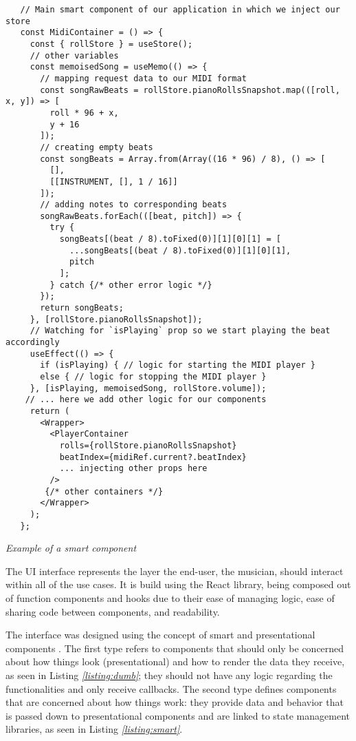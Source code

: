 \begin{listing}
  \begin{verbatim}
   // Main smart component of our application in which we inject our store
   const MidiContainer = () => {
     const { rollStore } = useStore();
     // other variables
     const memoisedSong = useMemo(() => {
       // mapping request data to our MIDI format
       const songRawBeats = rollStore.pianoRollsSnapshot.map(([roll, x, y]) => [
         roll * 96 + x,
         y + 16
       ]);
       // creating empty beats
       const songBeats = Array.from(Array((16 * 96) / 8), () => [
         [],
         [[INSTRUMENT, [], 1 / 16]]
       ]);
       // adding notes to corresponding beats
       songRawBeats.forEach(([beat, pitch]) => {
         try {
           songBeats[(beat / 8).toFixed(0)][1][0][1] = [
             ...songBeats[(beat / 8).toFixed(0)][1][0][1],
             pitch
           ];
         } catch {/* other error logic */}
       });
       return songBeats;
     }, [rollStore.pianoRollsSnapshot]);
     // Watching for `isPlaying` prop so we start playing the beat accordingly
     useEffect(() => {
       if (isPlaying) { // logic for starting the MIDI player }
       else { // logic for stopping the MIDI player }
     }, [isPlaying, memoisedSong, rollStore.volume]);
    // ... here we add other logic for our components
     return (
       <Wrapper>
         <PlayerContainer
           rolls={rollStore.pianoRollsSnapshot}
           beatIndex={midiRef.current?.beatIndex}
           ... injecting other props here
         />
        {/* other containers */}
       </Wrapper>
     );
   };
  \end{verbatim}
  \caption{\emph{Example of a smart component}}
  \label{listing:smart}
\end{listing}


The UI interface represents the layer the end-user,
the musician, should interact within all of the use cases.
It is build using the React library,
being composed out of function components and hooks due
to their ease of managing logic,
ease of sharing code between components, and readability.

The interface was designed using the concept of smart and presentational
components \cite{smart_dumb}. The first type refers to components that
should only be concerned about how things look (presentational)
and how to render the data they receive, as seen in Listing \emph{\ref{listing:dumb}};
they should not have any logic regarding the functionalities and
only receive callbacks. The second type defines components
that are concerned about how things work:
they provide data and behavior that is passed down
to presentational components and are linked to state management
libraries, as seen in Listing \emph{\ref{listing:smart}}.

